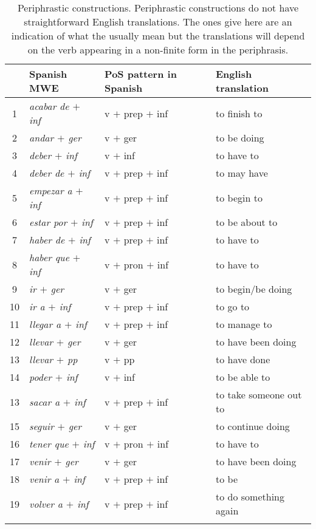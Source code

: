 \documentclass[output=paper]{langsci/langscibook}
\begin{document}
\begin{table}

\caption{Periphrastic constructions. Periphrastic constructions do not have straightforward English translations. The ones give here are an indication of what the usually mean but the translations will depend on the verb appearing in a non-finite form in the periphrasis.}
\label{tab:periphrasis}
\begin{tabular}{clll}
\lsptoprule
&{\textbf{Spanish MWE}} &{\textbf{PoS pattern in Spanish}} &{\textbf{English translation}} \\ %
\midrule
1 & \textit{acabar de $+$ inf} & v $+$ prep $+$ inf & to finish to\\
2 & \textit{andar $+$ ger} & v $+$ ger & to be doing\\
3 & \textit{deber $+$ inf} & v $+$ inf & to have to \\
4 & \textit{deber de $+$ inf} & v $+$ prep $+$ inf & to may have \\
5 & \textit{empezar a $+$ inf} & v $+$ prep $+$ inf & to begin to \\
6 & \textit{estar por $+$ inf} & v $+$ prep $+$ inf & to be about to \\
7 & \textit{haber de $+$ inf} & v $+$ prep $+$ inf & to have to \\
8 & \textit{haber que $+$ inf} & v $+$ pron $+$ inf & to have to \\
9 & \textit{ir $+$ ger} & v $+$ ger & to begin/be doing\\
10 & \textit{ir a $+$ inf} & v $+$ prep $+$ inf & to go to \\
11 & \textit{llegar a $+$ inf} & v $+$ prep $+$ inf & to manage to \\
12 & \textit{llevar $+$ ger} & v $+$ ger & to have been doing \\
13 & \textit{llevar $+$ pp} & v $+$ pp & to have done \\
14 & \textit{poder $+$ inf} & v $+$ inf & to be able to \\
13 & \textit{sacar a $+$ inf} & v $+$ prep $+$ inf & to take someone out to \\
15 & \textit{seguir $+$ ger} & v $+$ ger & to continue doing \\
16 & \textit{tener que $+$ inf} & v $+$ pron $+$ inf & to have to \\
17 & \textit{venir $+$ ger} & v $+$ ger & to have been doing \\
18 & \textit{venir a $+$ inf} & v $+$ prep $+$ inf & to be \\
19 & \textit{volver a $+$ inf} & v $+$ prep $+$ inf & to do something again\\
\lspbottomrule
\end{tabular}
\end{table}
 
\end{document}
